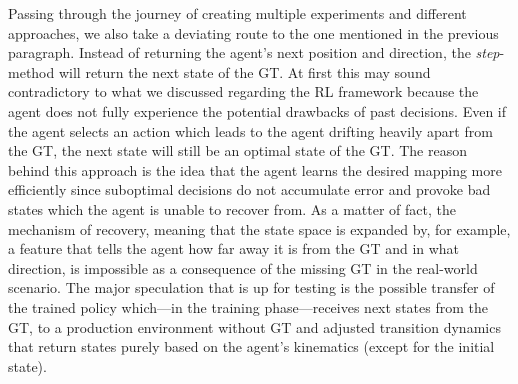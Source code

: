 Passing through the journey of creating multiple experiments and different approaches, we also take a deviating route to the one mentioned in the previous paragraph. Instead of returning the agent's next position and direction, the \textit{step}-method will return the next state of the GT. At first this may sound contradictory to what we discussed regarding the RL framework because the agent does not fully experience the potential drawbacks of past decisions. Even if the agent selects an action which leads to the agent drifting heavily apart from the GT, the next state will still be an optimal state of the GT. The reason behind this approach is the idea that the agent learns the desired mapping more efficiently since suboptimal decisions do not accumulate error and provoke bad states which the agent is unable to recover from. As a matter of fact, the mechanism of recovery, meaning that the state space is expanded by, for example, a feature that tells the agent how far away it is from the GT and in what direction, is impossible as a consequence of the missing GT in the real-world scenario. The major speculation that is up for testing is the possible transfer of the trained policy which—in the training phase—receives next states from the GT, to a production environment without GT and adjusted transition dynamics that return states purely based on the agent's kinematics (except for the initial state).